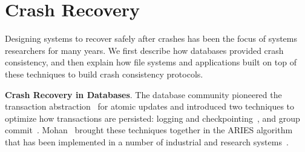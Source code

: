 \section{Crash Recovery}
\label{sec-related-crash}

Designing systems to recover safely after crashes has been the focus
of systems researchers for many years. We first describe how databases
provided crash consistency, and then explain how file systems and
applications built on top of these techniques to build crash
consistency protocols.

\vspace{0.1in} \noindent \textbf{Crash Recovery in Databases}. The
database community pioneered the transaction
abstraction~\cite{Gray81-TransactionConcept, grayetal81,
  MohanEtAl92-Aries} for atomic updates and introduced two techniques
to optimize how transactions are persisted: logging and
checkpointing~\cite{gray1978notes, haerder1983principles,
  MohanEtAl92-Aries}, and group commit~\cite{DewittEtAl84-MemoryDB,
  gawlick1985varieties, MohanEtAl92-Aries}. Mohan \etal\ brought these
techniques together in the ARIES algorithm~\cite{MohanEtAl92-Aries}
that has been implemented in a number of industrial and research
systems~\cite{chang19882, date1989guide, haskin1988recovery,
  schwarz1986extensibility, carey1986object, dewitt1990gamma,
  satyanarayanan1994lightweight}.

